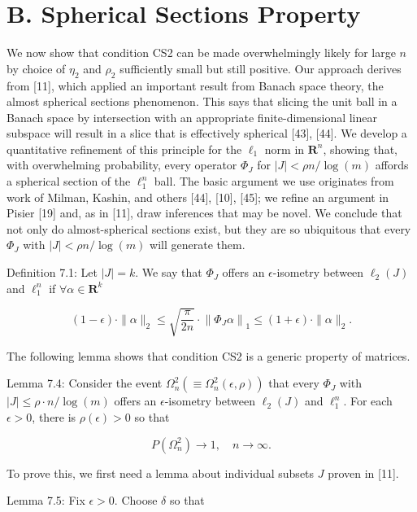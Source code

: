 \documentclass[10pt]{article}
\begin{document}
\section*{B. Spherical Sections Property}
We now show that condition CS2 can be made overwhelmingly likely for large $n$ by choice of $\eta_{2}$ and $\rho_{2}$ sufficiently small but still positive. Our approach derives from [11], which applied an important result from Banach space theory, the almost spherical sections phenomenon. This says that slicing the unit ball in a Banach space by intersection with an appropriate finite-dimensional linear subspace will result in a slice that is effectively spherical [43], [44]. We develop a quantitative refinement of this principle for the $\ell_{1}$ norm in $\boldsymbol{R}^{n}$, showing that, with overwhelming probability, every operator $\Phi_{J}$ for $|J|<\rho n / \log (m)$ affords a spherical section of the $\ell_{1}^{n}$ ball. The basic argument we use originates from work of Milman, Kashin, and others [44], [10], [45]; we refine an argument in Pisier [19] and, as in [11], draw inferences that may be novel. We conclude that not only do almost-spherical sections exist, but they are so ubiquitous that every $\Phi_{J}$ with $|J|<\rho n / \log (m)$ will generate them.

Definition 7.1: Let $|J|=k$. We say that $\Phi_{J}$ offers an $\epsilon$-isometry between $\ell_{2}(J)$ and $\ell_{1}^{n}$ if $\forall \alpha \in \boldsymbol{R}^{k}$


\begin{equation*}
(1-\epsilon) \cdot\|\alpha\|_{2} \leq \sqrt{\frac{\pi}{2 n}} \cdot\left\|\Phi_{J} \alpha\right\|_{1} \leq(1+\epsilon) \cdot\|\alpha\|_{2} . \tag{VII.1}
\end{equation*}


The following lemma shows that condition CS2 is a generic property of matrices.

Lemma 7.4: Consider the event $\Omega_{n}^{2}\left(\equiv \Omega_{n}^{2}(\epsilon, \rho)\right)$ that every $\Phi_{J}$ with $|J| \leq \rho \cdot n / \log (m)$ offers an $\epsilon$-isometry between $\ell_{2}(J)$ and $\ell_{1}^{n}$. For each $\epsilon>0$, there is $\rho(\epsilon)>0$ so that

$$
P\left(\Omega_{n}^{2}\right) \rightarrow 1, \quad n \rightarrow \infty .
$$

To prove this, we first need a lemma about individual subsets $J$ proven in [11].

Lemma 7.5: Fix $\epsilon>0$. Choose $\delta$ so that
\end{document}
